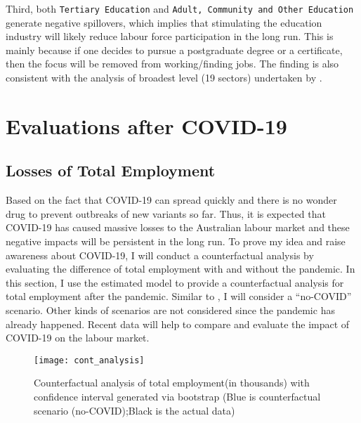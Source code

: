 \documentclass{monashthesis}
\begin{document}
Third, both \texttt{Tertiary\ Education} and \texttt{Adult,\ Community\ and\ Other\ Education} generate negative spillovers, which implies that stimulating the education industry will likely reduce labour force participation in the long run. This is mainly because if one decides to pursue a postgraduate degree or a certificate, then the focus will be removed from working/finding jobs. The finding is also consistent with the analysis of broadest level (19 sectors) undertaken by \textcite{anderson2020}.

\hypertarget{evaluations-after-covid-19}{%
\section{Evaluations after COVID-19}\label{evaluations-after-covid-19}}

\hypertarget{losses-of-total-employment}{%
\subsection{Losses of Total Employment}\label{losses-of-total-employment}}

Based on the fact that COVID-19 can spread quickly and there is no wonder drug to prevent outbreaks of new variants so far. Thus, it is expected that COVID-19 has caused massive losses to the Australian labour market and these negative impacts will be persistent in the long run. To prove my idea and raise awareness about COVID-19, I will conduct a counterfactual analysis by evaluating the difference of total employment with and without the pandemic. In this section, I use the estimated model to provide a counterfactual analysis for total employment after the pandemic. Similar to \textcite{anderson2020}, I will consider a ``no-COVID'' scenario. Other kinds of scenarios are not considered since the pandemic has already happened. Recent data will help to compare and evaluate the impact of COVID-19 on the labour market.

\begin{figure}[H]
\texttt{[image: cont\_analysis]}
\centering
\caption{Counterfactual analysis of total employment(in thousands) with confidence interval generated via bootstrap (Blue is counterfactual scenario (no-COVID);Black is the actual data)}
\label{fig:con}
\end{figure}
\end{document}

